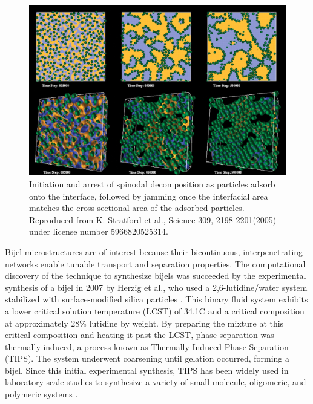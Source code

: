 \begin{figure}
    \centering
    \includegraphics[scale = 0.3]{figures/introduction/bijel_coarsening.jpg}
    \caption{Initiation and arrest of spinodal decomposition as particles adsorb onto the interface, followed by jamming once the 
    interfacial area matches the cross sectional area of the adsorbed particles\cite{stratford_colloidal_2005}. 
    Reproduced from K. Stratford et al., Science 309, 2198-2201(2005) under license number 5966820525314.}
    \label{fig:bijel_coarsen}
\end{figure}

Bijel microstructures are of interest because their bicontinuous, interpenetrating networks enable tunable transport and separation properties. The computational discovery of the technique to 
synthesize bijels was succeeded by the experimental synthesis of a bijel in 2007 by Herzig et al., who used a 2,6-lutidine/water system stabilized with surface-modified silica particles
\cite{herzig_bicontinuous_2007}.
This binary fluid system exhibits a lower critical solution temperature (LCST) of 34.1\textdegree C and a critical composition at approximately 28\% lutidine by weight. By preparing the mixture at this 
critical composition and heating it past the LCST, phase separation was thermally induced, a process known as Thermally Induced Phase Separation (TIPS). The system underwent coarsening until gelation 
occurred, forming a bijel. Since this initial experimental synthesis, TIPS has been widely used in laboratory-scale studies to synthesize a variety of small molecule, oligomeric, and polymeric systems 
\cite{tavacoli_novel_2011, lee_bicontinuous_2010, bai_dynamics_2015, ching_rapid_2021}. 

